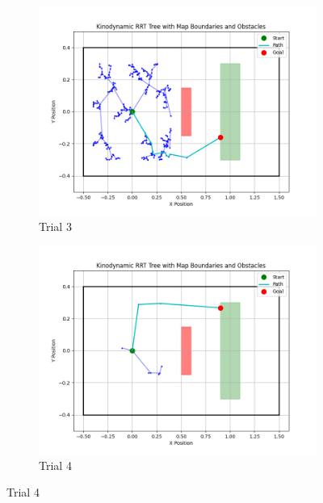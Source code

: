 \documentclass[12pt]{article}
\begin{document}
\begin{figure}[h!]
    \vspace{0.5cm} %

    \begin{subfigure}{0.45\textwidth}
        \centering
        \includegraphics[width=\textwidth]{./images/tree3.png}
        \caption{Trial 3}
        \label{fig:tree_3}
    \end{subfigure}
    \hfill
    \begin{subfigure}{0.45\textwidth}
        \centering
        \includegraphics[width=\textwidth]{./images/tree4.png}
        \caption{Trial 4}
        \label{fig:tree_4}
    \end{subfigure}


\end{figure}
\end{document}
